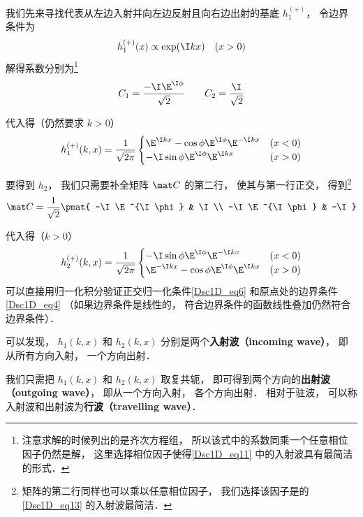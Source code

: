 我们先来寻找代表从左边入射并向左边反射且向右边出射的基底 $h_1^{(+)}$， 令边界条件为
\begin{equation}
h_1^{(+)}(x) \propto \exp(\I k x) \quad (x > 0)
\end{equation}
解得系数分别为\footnote{注意求解的时候列出的是齐次方程组， 所以该式中的系数同乘一个任意相位因子仍然是解， 这里选择相位因子使得\autoref{Dsc1D_eq11} 中的入射波具有最简洁的形式．}
\begin{equation}
C_1 = \frac{-\I\E^{\I \phi}}{\sqrt{2}} \qquad
C_2 =  \frac{\I}{\sqrt{2}}
\end{equation}

代入得（仍然要求 $k > 0$）
\begin{equation}\label{Dsc1D_eq11}
h_1^{(+)}(k, x) =  \frac{1}{\sqrt{2\pi}}
\begin{cases}
\E^{\I kx} - \cos\phi \E^{\I\phi} \E^{-\I k x} & (x < 0) \\
-\I\sin\phi\E^{\I\phi} \E^{\I kx}  & (x > 0)
\end{cases}
\end{equation}

要得到 $h_2$， 我们只需要补全矩阵 $\mat C$ 的第二行， 使其与第一行正交， 得到\footnote{矩阵的第二行同样也可以乘以任意相位因子， 我们选择该因子是的\autoref{Dsc1D_eq13} 的入射波最简洁．}
\begin{equation}
\mat C = \frac{1}{\sqrt{2}}\pmat{
-\I\E^{\I \phi} & \I \\
-\I\E^{\I \phi} & -\I
}\end{equation}

代入得（$k > 0$）
\begin{equation}\label{Dsc1D_eq13}
h_2^{(+)}(k, x) =  \frac{1}{\sqrt{2\pi}}
\begin{cases}
-\I\sin\phi\E^{\I\phi}\E^{-\I kx} &(x < 0) \\
\E^{-\I kx} - \cos\phi \E^{\I \phi} \E^{\I kx} &(x > 0)
\end{cases}
\end{equation}
可以直接用归一化积分验证正交归一化条件\autoref{Dsc1D_eq6} 和原点处的边界条件\autoref{Dsc1D_eq4} （如果边界条件是线性的， 符合边界条件的函数线性叠加仍然符合边界条件）．

可以发现， $h_1(k, x)$ 和 $h_2(k, x)$ 分别是两个\textbf{入射波（incoming wave）}， 即从所有方向入射， 一个方向出射．

我们只需把 $h_1(k, x)$ 和 $h_2(k, x)$ 取复共轭， 即可得到两个方向的\textbf{出射波（outgoing wave）}， 即从一个方向入射， 各个方向出射． 相对于驻波， 可以称入射波和出射波为\textbf{行波（travelling wave）}．

